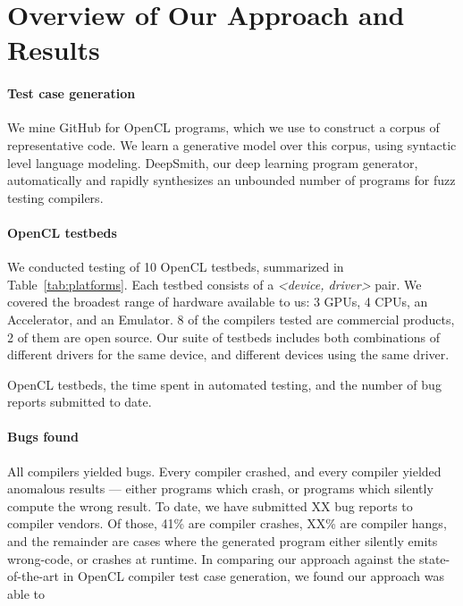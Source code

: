 \section{Overview of Our Approach and Results}\label{sec:overview}

\paragraph{Test case generation} We mine GitHub for OpenCL programs, which we use to construct a corpus of representative code. We learn a generative model over this corpus, using syntactic level language modeling. DeepSmith, our deep learning program generator, automatically and rapidly synthesizes an unbounded number of programs for fuzz testing compilers.

\paragraph{OpenCL testbeds} We conducted testing of 10 OpenCL testbeds, summarized in Table~\ref{tab:platforms}. Each testbed consists of a \emph{<device, driver>} pair. We covered the broadest range of hardware available to us: 3 GPUs, 4 CPUs, an Accelerator, and an Emulator. 8 of the compilers tested are commercial products, 2 of them are open source. Our suite of testbeds includes both combinations of different drivers for the same device, and different devices using the same driver.


\begin{table*}[t!]
	\scriptsize %
	\centering %
	
	\caption{OpenCL testbeds, the time spent in automated testing, and the number of bug reports submitted to date.}
	\label{tab:platforms}
\end{table*}


\paragraph{Bugs found} All compilers yielded bugs. Every compiler crashed, and every compiler yielded anomalous results --- either programs which crash, or programs which silently compute the wrong result. To date, we have submitted XX bug reports to compiler vendors. Of those, 41\% are compiler crashes, XX\% are compiler hangs, and the remainder are cases where the generated program either silently emits wrong-code, or crashes at runtime. In comparing our approach against the state-of-the-art in OpenCL compiler test case generation, we found our approach was able to \cc{\ldots}